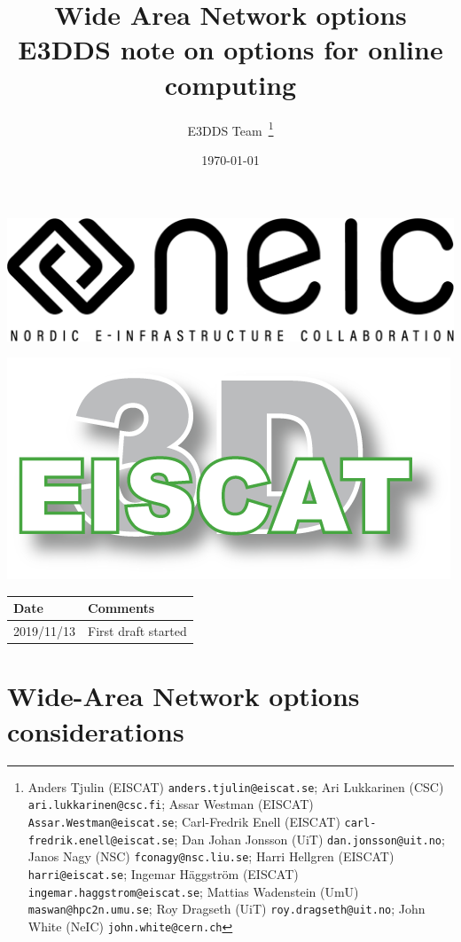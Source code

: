 \documentclass[12pt,a4paper]{article}
\title{
{\bf \ED Wide Area Network options} \\
E3DDS note on options for online computing}
\author{E3DDS Team~\footnote{
Anders Tjulin (EISCAT) {\tt anders.tjulin@eiscat.se};
Ari Lukkarinen (CSC) {\tt ari.lukkarinen@csc.fi};
Assar Westman (EISCAT) {\tt Assar.Westman@eiscat.se};
Carl-Fredrik Enell (EISCAT) {\tt carl-fredrik.enell@eiscat.se};
Dan Johan Jonsson (UiT) {\tt dan.jonsson@uit.no};
Janos Nagy (NSC) {\tt fconagy@nsc.liu.se};
Harri Hellgren (EISCAT) {\tt harri@eiscat.se};
Ingemar H\"{a}ggstr\"{o}m (EISCAT) {\tt ingemar.haggstrom@eiscat.se};
Mattias Wadenstein (UmU) {\tt maswan@hpc2n.umu.se};
Roy Dragseth (UiT) {\tt roy.dragseth@uit.no};
John White (NeIC) {\tt john.white@cern.ch}}}
\date{\today}
\begin{document}
\pagestyle{fancy}

\maketitle
\par\noindent
\begin{minipage}{0.45\textwidth}
  \includegraphics[scale=0.18]{NEIC_logo_screen_black.pdf}
\end{minipage}
\begin{minipage}{0.45\textwidth}
  \hfill
  \includegraphics[width=0.75\linewidth]{e3d-logo-green-500px}
\end{minipage}

\begin{center}
\begin{tabular}{|l|l|} \hline
\large \bf Date & \large \bf Comments \\ \hline
\large 2019/11/13 & First draft started \\ \hline
\end{tabular}
\end{center}

\newpage
\tableofcontents
\newpage

\section{Wide-Area Network options considerations}
\label{sec:wan-options}
\end{document}
